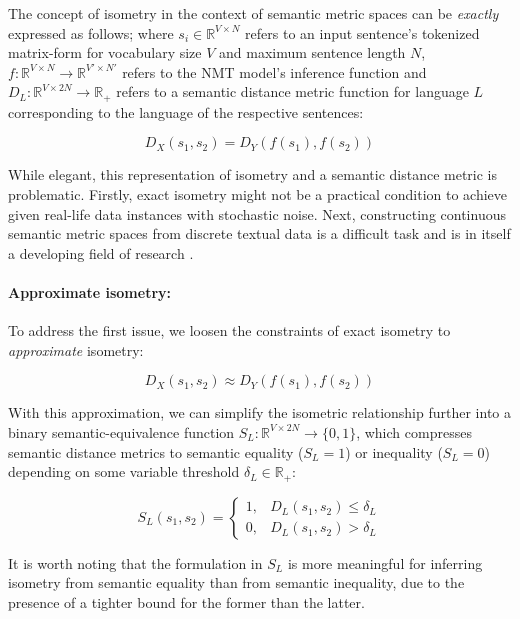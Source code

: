 \documentclass[11pt,a4paper]{article}
\begin{document}
The concept of isometry in the context of semantic metric spaces can be \textit{exactly} expressed as follows; where $s_i \in \mathbb{R}^{V \times N}$ refers to an input sentence's tokenized matrix-form for vocabulary size $V$ and maximum sentence length $N$, $f: \mathbb{R}^{V \times N} \to \mathbb{R}^{V' \times N'}$ refers to the NMT model's inference function and $D_L: \mathbb{R}^{V \times 2N} \to \mathbb{R}_+$ refers to a semantic distance metric function for language $L$ corresponding to the language of the respective sentences:

\begin{equation}  
  \label{exact_isometry_eqn}
  D_X(s_1,s_2) = D_Y(f(s_1),f(s_2))
\end{equation}

While elegant, this representation of isometry and a semantic distance metric is problematic. Firstly, exact isometry might not be a practical condition to achieve given real-life data instances with stochastic noise. Next, constructing continuous semantic metric spaces from discrete textual data is a difficult task and is in itself a developing field of research \cite{cer2017semeval}.

\paragraph{Approximate isometry:} To address the first issue, we loosen the constraints of exact isometry to \textit{approximate} isometry:

\begin{equation} 
  \label{approx_isometry_eqn}
  D_X(s_1,s_2) \approx D_Y(f(s_1),f(s_2)) 
\end{equation}

With this approximation, we can simplify the isometric relationship further into a binary semantic-equivalence function $S_L: \mathbb{R}^{V \times 2N} \to \{0,1\}$, which compresses semantic distance metrics to semantic equality ($S_L=1$) or inequality ($S_L=0$) depending on some variable threshold $\delta_L \in \mathbb{R}_+$:

\begin{equation}
  \label{bounded_isometry_eqn}
  S_L(s_1,s_2) =
  \begin{cases}
    1, &D_L(s_1,s_2) \leq \delta_L \\
    0, &D_L(s_1,s_2) > \delta_L
  \end{cases}
\end{equation}

It is worth noting that the formulation in $S_L$ is more meaningful for inferring isometry from semantic equality than from semantic inequality, due to the presence of a tighter bound for the former than the latter.
\end{document}
